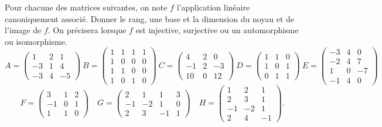 \documentclass[a4paper, 11pt,reqno]{article}
\begin{document}
\begin{exercice}  \;
	Pour chacune des matrices suivantes, on note $f$ l'application lin\'eaire canoniquement associ\'e. Donner le rang, une base et la dimension du noyau et de l'image de $f$. On pr\'ecisera lorsque $f$ est injective, surjective ou un automorphisme ou isomorphisme.
	$$A=\left(\begin{array}{rrr} 1&2&1 \\ -3&1&4 \\ -3&4&-5    \end{array}\right)\
		B=\left(\begin{array}{rrrr} 1&1&1&1 \\ 1&0&0&0 \\ 1&1&0&0 \\ 1&0&1&0    \end{array}\right)\
		C=\left(\begin{array}{rrr} 4&2&0 \\ -1&2&-3 \\ 10&0&12    \end{array}\right) \
		D=\left(\begin{array}{rrr} 1&1&0 \\ 1&0&1 \\ 0&1&1    \end{array}\right)\
		E=\left(\begin{array}{rrr} -3&4&0 \\ -2&4&7 \\ 1&0&-7 \\-1&4&0    \end{array}\right)$$
	$$F=\left(\begin{array}{rrr} 3&1&2\\ -1&0&1\\ 1&1&0  \end{array}\right)\quad G=\left(\begin{array}{rrrr} 2&1&1&3\\ -1&-2&1&0\\ 2&3&-1&1  \end{array}\right)\quad
		H=\left(\begin{array}{rrr} 1&2&1\\ 2&3&1\\ -1&-2&1\\ 2&4&-1  \end{array}\right).$$
\end{exercice}
\end{document}
